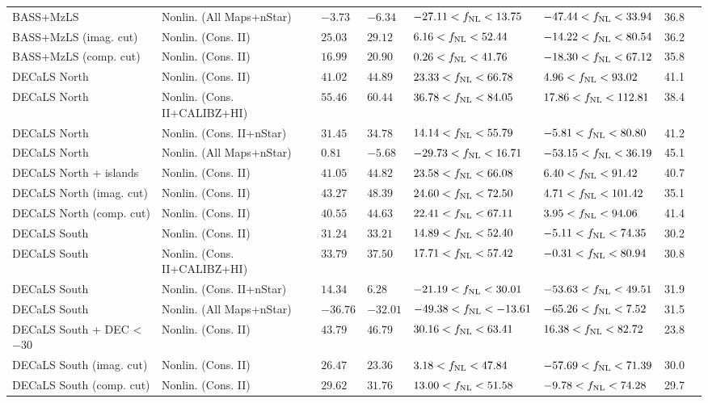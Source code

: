 \begin{table}
{\begin{tabular}{llllllll}
BASS+MzLS                 & Nonlin. (All Maps+nStar)& $ -3.73$& $ -6.34$& $-27.11<f_{\rm NL}< 13.75$& $-47.44<f_{\rm NL}< 33.94$ &   36.8\\
BASS+MzLS (imag. cut)     & Nonlin. (Cons. II)& $ 25.03$& $ 29.12$& $  6.16<f_{\rm NL}< 52.44$& $-14.22<f_{\rm NL}< 80.54$ &   36.2\\
BASS+MzLS (comp. cut)     & Nonlin. (Cons. II)& $ 16.99$& $ 20.90$& $  0.26<f_{\rm NL}< 41.76$& $-18.30<f_{\rm NL}< 67.12$ &   35.8\\
DECaLS North              & Nonlin. (Cons. II)& $ 41.02$& $ 44.89$& $ 23.33<f_{\rm NL}< 66.78$& $  4.96<f_{\rm NL}< 93.02$ &   41.1\\
DECaLS North              & Nonlin. (Cons. II+CALIBZ+HI)& $ 55.46$& $ 60.44$& $ 36.78<f_{\rm NL}< 84.05$& $ 17.86<f_{\rm NL}<112.81$ &   38.4\\
DECaLS North              & Nonlin. (Cons. II+nStar)& $ 31.45$& $ 34.78$& $ 14.14<f_{\rm NL}< 55.79$& $ -5.81<f_{\rm NL}< 80.80$ &   41.2\\
DECaLS North              & Nonlin. (All Maps+nStar)& $  0.81$& $ -5.68$& $-29.73<f_{\rm NL}< 16.71$& $-53.15<f_{\rm NL}< 36.19$ &   45.1\\
DECaLS North + islands & Nonlin. (Cons. II)& $ 41.05$& $ 44.82$& $ 23.58<f_{\rm NL}< 66.08$& $  6.40<f_{\rm NL}< 91.42$ &   40.7\\
DECaLS North (imag. cut)  & Nonlin. (Cons. II)& $ 43.27$& $ 48.39$& $ 24.60<f_{\rm NL}< 72.50$& $  4.71<f_{\rm NL}<101.42$ &   35.1\\
DECaLS North (comp. cut)  & Nonlin. (Cons. II)& $ 40.55$& $ 44.63$& $ 22.41<f_{\rm NL}< 67.11$& $  3.95<f_{\rm NL}< 94.06$ &   41.4\\
DECaLS South              & Nonlin. (Cons. II)& $ 31.24$& $ 33.21$& $ 14.89<f_{\rm NL}< 52.40$& $ -5.11<f_{\rm NL}< 74.35$ &   30.2\\
DECaLS South              & Nonlin. (Cons. II+CALIBZ+HI)& $ 33.79$& $ 37.50$& $ 17.71<f_{\rm NL}< 57.42$& $ -0.31<f_{\rm NL}< 80.94$ &   30.8\\
DECaLS South              & Nonlin. (Cons. II+nStar)& $ 14.34$& $  6.28$& $-21.19<f_{\rm NL}< 30.01$& $-53.63<f_{\rm NL}< 49.51$ &   31.9\\
DECaLS South              & Nonlin. (All Maps+nStar)& $-36.76$& $-32.01$& $-49.38<f_{\rm NL}<-13.61$& $-65.26<f_{\rm NL}<  7.52$ &   31.5\\
DECaLS South + DEC < $-30$ & Nonlin. (Cons. II)& $ 43.79$& $ 46.79$& $ 30.16<f_{\rm NL}< 63.41$& $ 16.38<f_{\rm NL}< 82.72$ &   23.8\\
DECaLS South (imag. cut)  & Nonlin. (Cons. II)& $ 26.47$& $ 23.36$& $  3.18<f_{\rm NL}< 47.84$& $-57.69<f_{\rm NL}< 71.39$ &   30.0\\
DECaLS South (comp. cut)  & Nonlin. (Cons. II)& $ 29.62$& $ 31.76$& $ 13.00<f_{\rm NL}< 51.58$& $ -9.78<f_{\rm NL}< 74.28$ &   29.7\\
   \hline
    \end{tabular}
}
\end{table}


